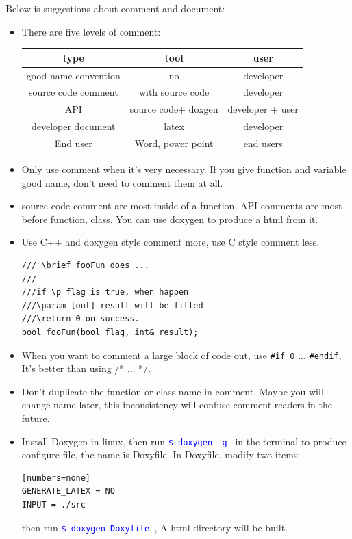 \documentclass[a4paper,11pt,twoside]{book}
\newcommand{\linuxcommand}[1]{\texttt{\textcolor{blue}{\$ #1 \Pisymbol{psy}{191}}}}
\newcommand{\tophline}{\hline }
\newcommand{\bottomhline}{\\ \hline }
\newcommand{\tophline}{ }
\newcommand{\bottomhline}{ }
\begin{document}
Below is suggestions about comment and document:

\begin{itemize}
	\item There are five levels of comment: \\
	\begin{tabular}{|c|c|c|}
		\tophline 
		type & tool & user \\ 
		\tophline 
		good name convention & no & developer  \\ 
		\tophline 
		source code comment & with source code &  developer \\ 
		\tophline 
		API & source code+ doxgen  & developer + user  \\ 
		\tophline 
		developer document & latex &  developer \\ 
		\tophline 
		End user & Word, power point & end users 
		\bottomhline 
	\end{tabular} 
	
	\item Only use comment when it's very necessary. If you give function and variable good name, don't need to comment them at all. 
	
	\item source code comment are most inside of a function. API comments are most before function, class. You can use doxygen to produce a html from it. 
	
	\item Use C++ and doxygen style comment more, use C style comment less.
	
\begin{lstlisting}[numbers=none]
/// \brief fooFun does ...
///
///if \p flag is true, when happen
///\param [out] result will be filled
///\return 0 on success.
bool fooFun(bool flag, int& result);
\end{lstlisting}
	
	\item When you want to comment a large block of code out, use \texttt{\#if 0} ...  \texttt{\#endif}, It's better than using /* ... */. 
	
	\item Don't duplicate the function or class name in comment. Maybe you will change name later, this inconsistency will confuse comment readers in the future.
	
	\item Install Doxygen in linux, then run \linuxcommand{doxygen -g} in the terminal to produce configure file, the name is Doxyfile.  In Doxyfile, modify two items:
\begin{verbatim}[numbers=none]
GENERATE_LATEX = NO
INPUT = ./src
\end{verbatim}
	then run \linuxcommand{doxygen Doxyfile}, A html directory will be built.
	

\end{itemize}
\end{document}
